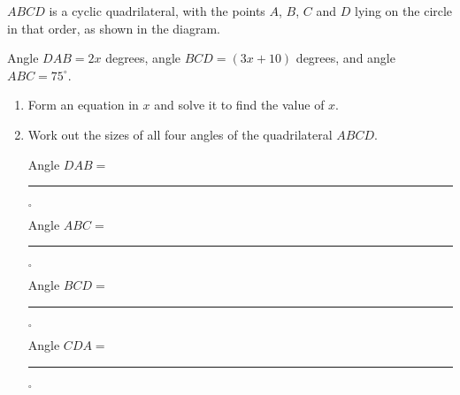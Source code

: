 \begin{question}
\noindent $ABCD$ is a cyclic quadrilateral, with the points $A$, $B$, $C$ and $D$ lying on the circle in that order, as shown in the diagram.

\begin{center}
\end{center}

\noindent Angle $DAB = 2x$ degrees, angle $BCD = (3x + 10)$ degrees, and angle $ABC = 75^\circ$.

\begin{enumerate}
    \item[(a)] Form an equation in $x$ and solve it to find the value of $x$.

    \vspace{4cm}

    \item[(b)] Work out the sizes of all four angles of the quadrilateral $ABCD$.

    \vspace{4cm}
    \begin{flushright}
    Angle $DAB = $ \rule{2cm}{0.4pt}$^\circ$\\[0.3cm]
    Angle $ABC = $ \rule{2cm}{0.4pt}$^\circ$\\[0.3cm]
    Angle $BCD = $ \rule{2cm}{0.4pt}$^\circ$\\[0.3cm]
    Angle $CDA = $ \rule{2cm}{0.4pt}$^\circ$
    \end{flushright}
\end{enumerate}
\end{question}
